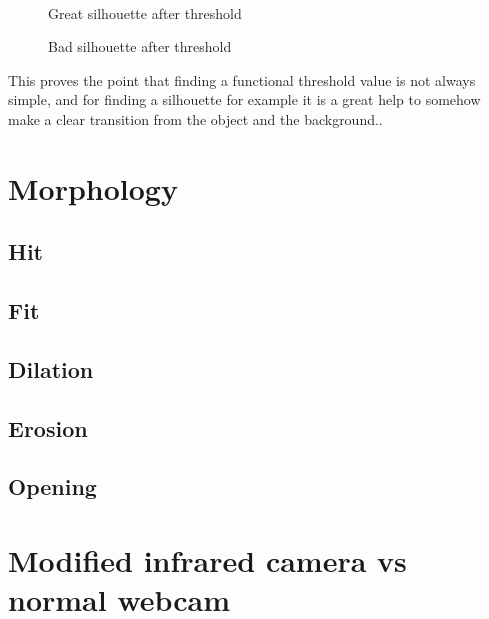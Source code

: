 \begin{figure}[htbp]
\begin{minipage}[b]{0.45\textwidth}
\end{minipage} \\ %
\begin{minipage}[t]{0.45\textwidth}
\caption{Great silhouette after threshold} %
\label{fig:SimpleThresholdAfter}
\end{minipage} \hfill
\begin{minipage}[t]{0.45\textwidth}
\caption{Bad silhouette after threshold} %
\label{fig:ComplicatedThresholdAfter}
\end{minipage}
\end{figure}
 
This proves the point that finding a functional threshold value is not always simple, and for finding a silhouette for example it is a great help to somehow make a clear transition from the object and the background..

\section{Morphology}
\subsection{Hit}
\subsection{Fit}
\subsection{Dilation}
\subsection{Erosion}
\subsection{Opening}
\section{Modified infrared camera vs normal webcam}
